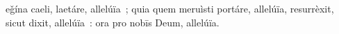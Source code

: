 eǧína caeli, laetáre, allelúïa~; quia quem meruìsti portáre, allelúïa, resurrèxit, sicut dixit, allelúïa~: ora pro nobīs Deum, allelúïa.
